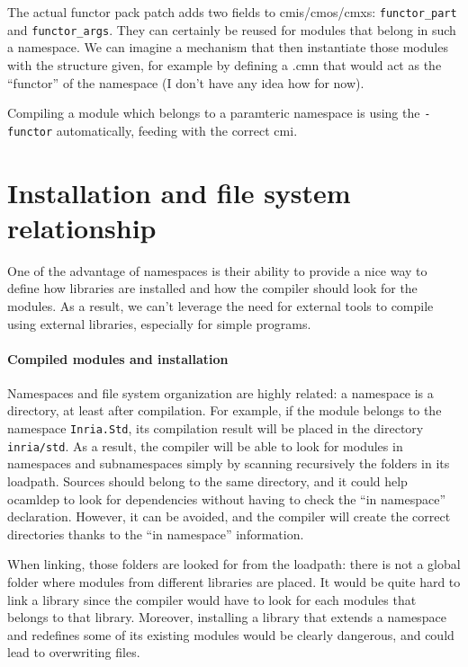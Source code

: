 \documentclass[11pt,a4paper]{article}
\begin{document}
The actual functor pack patch adds two fields to cmis/cmos/cmxs:
\lstinline{functor_part} and \lstinline{functor_args}. They can certainly be
reused for modules that belong in such a namespace. We can imagine a mechanism
that then instantiate those modules with the structure given, for example by
defining a .cmn that would act as the ``functor'' of the namespace (I don't have
any idea how for now).

Compiling a module which belongs to a paramteric namespace is using the
\lstinline{-functor} automatically, feeding with the correct cmi. 

\section{Installation and file system relationship}

One of the advantage of namespaces is their ability to provide a nice way to
define how libraries are installed and how the compiler should look for the
modules. As a result, we can't leverage the need for external tools to compile
using external libraries, especially for simple programs.

\paragraph{Compiled modules and installation}

Namespaces and file system organization are highly related: a namespace is a
directory, at least after compilation. For example, if the module belongs to the
namespace \texttt{Inria.Std}, its compilation result will be placed in the
directory \texttt{inria/std}. As a result, the compiler will be able to look for
modules in namespaces and subnamespaces simply by scanning recursively the
folders in its loadpath. Sources should belong to the same directory, and it
could help ocamldep to look for dependencies without having to check the ``in
namespace'' declaration. However, it can be avoided, and the compiler will
create the correct directories thanks to the ``in namespace'' information.

When linking, those folders are looked for from the loadpath: there is not a
global folder where modules from different libraries are placed. It would be
quite hard to link a library since the compiler would have to look for each
modules that belongs to that library. Moreover, installing a library that
extends a namespace and redefines some of its existing modules would be clearly
dangerous, and could lead to overwriting files.
\end{document}
